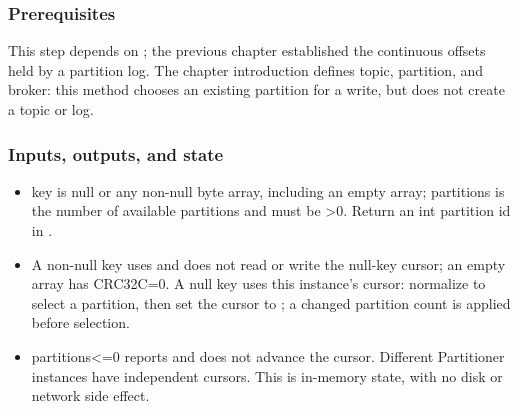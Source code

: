 \subsubsection*{Prerequisites}
This step depends on ; the previous chapter established the continuous offsets held by a partition log. The chapter introduction defines topic, partition, and broker: this method chooses an existing partition for a write, but does not create a topic or log.
\subsubsection*{Inputs, outputs, and state}
\begin{itemize}
\item key is null or any non-null byte array, including an empty array; partitions is the number of available partitions and must be >0. Return an int partition id in \pathcode{[0,partitions)}.
\item A non-null key uses  and does not read or write the null-key cursor; an empty array has CRC32C=0. A null key uses this instance's cursor: normalize  to select a partition, then set the cursor to ; a changed partition count is applied before selection.
\item partitions<=0 reports  and does not advance the cursor. Different Partitioner instances have independent cursors. This is in-memory state, with no disk or network side effect.
\end{itemize}
